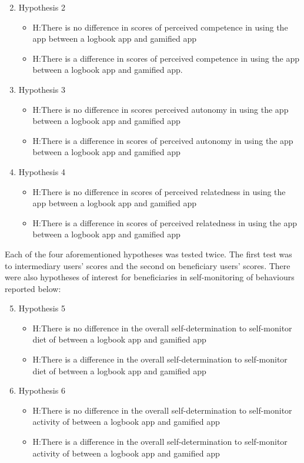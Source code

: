 \begin{enumerate}
 \setcounter{enumi}{1}
\item{Hypothesis 2}
\begin{itemize}
\item{H}:There is no difference in scores of perceived competence in using the app between a logbook app and gamified app
\item{H}:There is a difference in scores of perceived competence in using the app between a logbook app and gamified app.
\end{itemize}
\item{Hypothesis 3}
\begin{itemize}
\item{H}:There is no difference in scores perceived autonomy in using the app between a logbook app and gamified app
\item{H}:There is a difference in scores of perceived autonomy in using the app between a logbook app and gamified app
\end{itemize}
\item{Hypothesis 4}
\begin{itemize}
\item{H}:There is no difference in scores of perceived relatedness in using the app between a logbook app and gamified app
\item{H}:There is a difference in scores of perceived relatedness in using the app between a logbook app and gamified app
\end{itemize}
\end{enumerate}

Each of the four aforementioned hypotheses was tested twice. The first test was to intermediary users' scores and the second on beneficiary users' scores. There were also hypotheses of interest for beneficiaries in self-monitoring of behaviours reported below:

\begin{enumerate}
 \setcounter{enumi}{4}
\item{Hypothesis 5}
\begin{itemize}
\item{H}:There is no difference in the overall self-determination to self-monitor diet of between a logbook app and gamified app
\item{H}:There is a difference in the overall self-determination to self-monitor diet of between a logbook app and gamified app
\end{itemize}
\item{Hypothesis 6}
\begin{itemize}
\item{H}:There is no difference in the overall self-determination to self-monitor activity of between a logbook app and gamified app
\item{H}:There is a difference in the overall self-determination to self-monitor activity of between a logbook app and gamified app
\end{itemize}
\end{enumerate}

